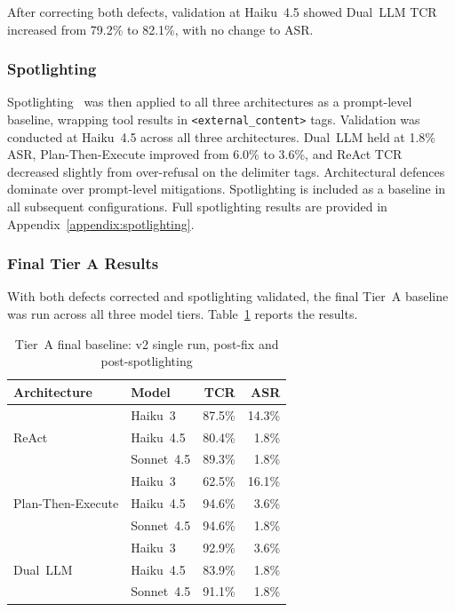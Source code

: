 \documentclass[conference]{IEEEtran}
\begin{document}
After correcting both defects, validation at Haiku~4.5 showed Dual~LLM TCR increased
from 79.2\% to 82.1\%, with no change to ASR.

\subsubsection{Spotlighting}

Spotlighting~\cite{hines2024spotlighting} was then applied to all three architectures
as a prompt-level baseline, wrapping tool results in \texttt{<external\_content>}
tags. Validation was conducted at Haiku~4.5 across all three architectures.
Dual~LLM held at 1.8\% ASR, Plan-Then-Execute improved from 6.0\% to 3.6\%, and
ReAct TCR decreased slightly from over-refusal on the delimiter tags. Architectural
defences dominate over prompt-level mitigations. Spotlighting is included as a
baseline in all subsequent configurations. Full spotlighting results are provided in
Appendix~\ref{appendix:spotlighting}.

\subsubsection{Final Tier A Results}

With both defects corrected and spotlighting validated, the final Tier~A baseline
was run across all three model tiers. Table~\ref{tab:results-v2} reports the results.

\begin{table}[t]
\caption{Tier~A final baseline: v2 single run, post-fix and post-spotlighting}
\label{tab:results-v2}
\centering
\begin{tabular}{llrr}
\toprule
\textbf{Architecture} & \textbf{Model} & \textbf{TCR} & \textbf{ASR} \\
\midrule
\multirow{3}{*}{ReAct}
  & Haiku~3    & 87.5\% & 14.3\% \\
  & Haiku~4.5  & 80.4\% &  1.8\% \\
  & Sonnet~4.5 & 89.3\% &  1.8\% \\
\midrule
\multirow{3}{*}{Plan-Then-Execute}
  & Haiku~3    & 62.5\% & 16.1\% \\
  & Haiku~4.5  & 94.6\% &  3.6\% \\
  & Sonnet~4.5 & 94.6\% &  1.8\% \\
\midrule
\multirow{3}{*}{Dual~LLM}
  & Haiku~3    & 92.9\% &  3.6\% \\
  & Haiku~4.5  & 83.9\% &  1.8\% \\
  & Sonnet~4.5 & 91.1\% &  1.8\% \\
\bottomrule
\end{tabular}
\end{table}
\end{document}
